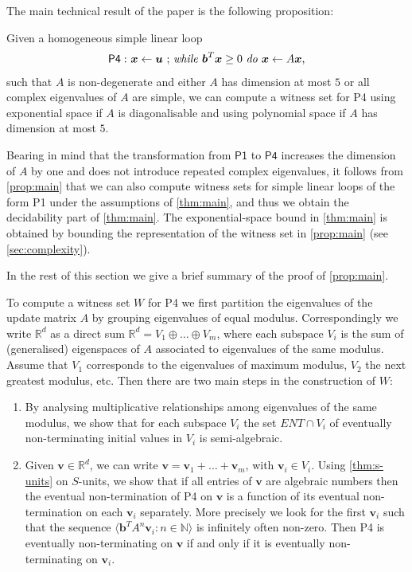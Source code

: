 The main technical result of the paper is the following proposition:
\begin{proposition}
Given a homogeneous simple linear loop
\begin{gather*}
\mathsf{P4:}\ \mbox{$\boldsymbol{x}\gets \boldsymbol{u}$ ;
\textit{while} $\boldsymbol{b}^T\boldsymbol{x} \geq 0$ \textit{do} $\boldsymbol{x}\leftarrow A\boldsymbol{x}$,}
\end{gather*}
such that $A$ is non-degenerate and either $A$ has dimension at most
$5$ or all complex eigenvalues of $A$ are simple,  we can compute a
witness set for \textsf{P4} using exponential space if $A$ is diagonalisable and using polynomial space if $A$ has dimension at most $5$.
\label{prop:main}
\end{proposition}

Bearing in mind that the transformation from $\mathsf{P1}$ to
$\mathsf{P4}$ increases the dimension of $A$ by one and does not
introduce repeated complex eigenvalues, it follows from
\cref{prop:main} that we can also compute witness sets for
simple linear loops of the form \textsf{P1}
under the assumptions of \cref{thm:main}, and thus we obtain
the decidability part of \cref{thm:main}.  The
exponential-space bound in \cref{thm:main} is obtained by
bounding the representation of the witness set in
\cref{prop:main} (see \cref{sec:complexity}).

In the rest of this section we give a brief summary of the proof of
\cref{prop:main}.

To compute a witness set $W$ for \textsf{P4} we first partition the
eigenvalues of the update matrix $A$ by grouping eigenvalues of equal
modulus.  Correspondingly we write $\mathbb{R}^d$ as a direct sum
$\mathbb{R}^d = V_1 \oplus \ldots \oplus V_m$, where each subspace
$V_i$ is the sum of (generalised) eigenspaces of $A$ associated to
eigenvalues of the same modulus.  Assume that $V_1$ corresponds to the
eigenvalues of maximum modulus, $V_2$ the next greatest modulus,
etc.  Then there are two main steps in the construction of $W$:
\begin{enumerate}
\item
 By analysing multiplicative relationships among eigenvalues of the
 same modulus, we show that for each subspace $V_i$ the set
 $\mathit{ENT}\cap V_i$ of eventually non-terminating initial values
 in $V_i$ is semi-algebraic.
\item
Given $\boldsymbol{v} \in \mathbb{R}^d$, we can write
$\boldsymbol{v}=\boldsymbol{v}_1+\ldots+\boldsymbol{v}_m$, with
$\boldsymbol{v}_i \in V_i$.  Using \cref{thm:s-units} on
$S$-units, we show that if all entries of $\boldsymbol{v}$ are
algebraic numbers then the eventual non-termination of \textsf{P4} on
$\boldsymbol{v}$ is a function of its eventual non-termination on each
$\boldsymbol{v}_i$ separately.  More precisely we look for the first
$\boldsymbol{v}_i$ such that the sequence $\langle
\boldsymbol{b}^TA^n\boldsymbol{v}_i : n \in \mathbb{N}\rangle$ is infinitely often non-zero. Then \textsf{P4} is eventually non-terminating on
$\boldsymbol{v}$ if and only if it is eventually non-terminating on
$\boldsymbol{v}_i$.
\end{enumerate}

